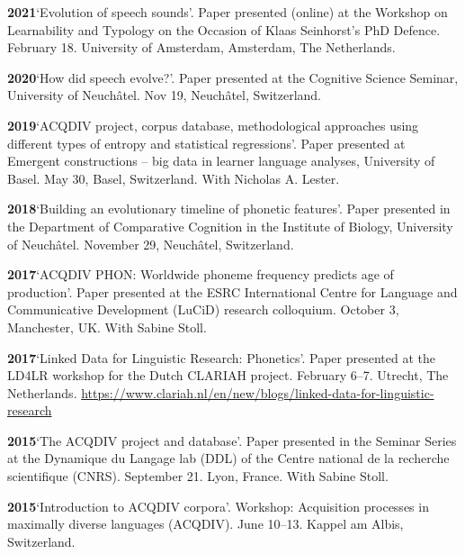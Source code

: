 \documentclass[11pt]{article}
\newcommand{\hangpara}{
 \setlength{\parindent}{0in} %
 \hangindent=0.42in %
}
\begin{document}
\vskip 6pt
\hangpara
{\bf 2021}\hspace{1ex}`Evolution of speech sounds'. Paper presented (online) at the Workshop on Learnability and Typology
on the Occasion of Klaas Seinhorst’s PhD Defence. February 18. University of Amsterdam, Amsterdam, The Netherlands.

\vskip 6pt
\hangpara
{\bf 2020}\hspace{1ex}`How did speech evolve?'. Paper presented at the Cognitive Science Seminar, University of Neuchâtel. Nov 19, Neuchâtel, Switzerland.

\vskip 6pt
\hangpara
{\bf 2019}\hspace{1ex}`ACQDIV project, corpus database, methodological approaches using different types of entropy and statistical regressions'. Paper presented at Emergent constructions -- big data in learner language analyses, University of Basel. May 30, Basel, Switzerland. With Nicholas A. Lester.

\vskip 6pt
\hangpara
{\bf 2018}\hspace{1ex}`Building an evolutionary timeline of phonetic features'. Paper presented in the Department of Comparative Cognition in the Institute of Biology, University of Neuchâtel. November 29, Neuchâtel, Switzerland.

\vskip 6pt
\hangpara
{\bf 2017}\hspace{1ex}`ACQDIV PHON: Worldwide phoneme frequency predicts age of production'. Paper presented at the ESRC International Centre for Language and Communicative Development (LuCiD) research colloquium. October 3, Manchester, UK. With Sabine Stoll.

\vskip 6pt
\hangpara
{\bf 2017}\hspace{1ex}`Linked Data for Linguistic Research: Phonetics'. Paper presented at the LD4LR workshop for the Dutch CLARIAH project. February 6--7. Utrecht, The Netherlands. \url{https://www.clariah.nl/en/new/blogs/linked-data-for-linguistic-research}

\vskip 6pt
\hangpara
{\bf 2015}\hspace{1ex}`The ACQDIV project and database'. Paper presented in the Seminar Series at the Dynamique du Langage lab (DDL) of the Centre national de la recherche scientifique (CNRS). September 21. Lyon, France. With Sabine Stoll.

\vskip 6pt
\hangpara
{\bf 2015}\hspace{1ex}`Introduction to ACQDIV corpora'. Workshop: Acquisition processes in maximally diverse languages (ACQDIV). June 10--13. Kappel am Albis, Switzerland.
\end{document}
